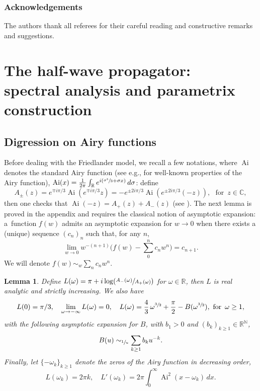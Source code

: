 \documentclass[11pt]{article}
\newcommand{\eg}{e.g.,\xspace}
\newcommand{\Psfrac}[2]{(\sfrac{#1}{#2})}
\DeclareMathOperator{\Ai}{Ai}
\newcommand\N{{\mathbb N}}
\newcommand\R{{\mathbb R}}
\theoremstyle{plain}
\newtheorem{lemma}{Lemma}
\theoremstyle{definition}
\begin{document}
\subsubsection*{Acknowledgements}
The authors thank all referees for their careful reading and constructive remarks and suggestions.

\section{The half-wave propagator:\texorpdfstring{\\}{cr} spectral analysis and parametrix construction}

\subsection{Digression on Airy functions}
Before dealing with the Friedlander model, we recall a few notations, where $\Ai$ denotes the standard Airy function (see \eg \cite{AFbook} for well-known properties of the Airy function), $ \Ai(x)=\frac 1 {2\pi } \int_{\R} e^{ i (\sfrac{\sigma^{3}}{3}+\sigma x)} \,d\sigma$: define
\begin{equation}
\label{eq:Apm}
A_\pm(z)=e^{\mp i\pi/3} \Ai(e^{\mp i\pi/3} z)=-e^{\pm 2i\pi/3} \Ai(e^{\pm 2i\pi/3} (-z)),\,\,\text{ for } \,
z\in \mathbb{C},
\end{equation}
then one checks that $\Ai(-z)=A_+(z)+A_-(z)$ (see \cite[(2.3)]{AFbook}). The next lemma is proved in the appendix and requires the classical notion of asymptotic expansion: a~function $f(w)$ admits an asymptotic expansion for $w\to 0$ when there exists a (unique) sequence $(c_{n})_{n}$ such that, for any $n$,
\[
\lim_{w\to 0} w^{-(n+1)}\biggl(f(w)-\sum_{0}^{n} c_{n} w^{n}\biggr)=c_{n+1}.
\]
We will denote $ f(w)\sim_{w} \sum_{n} c_{n} w^{n}$.
\begin{lemma}
\label{lemL}
Define
$L(\omega)=\pi+i\log \Psfrac{A_-(\omega)}{A_+(\omega)}$ for $\omega \in \R$,
then $L$ is real analytic and strictly increasing. We also
have
\begin{equation}
\label{eq:propL}
L(0)=\pi/3,\quad\lim_{\omega\to -\infty} L(\omega)=0,\quad
L(\omega)=\frac 4 3\, \omega^{\sfrac 3 2}+\frac{\pi}{2}-B(\omega^{\sfrac 3 2}),\,\,\text{for } \,\omega\geq 1,
\end{equation}
with the following asymptotic expansion for $B$, with $b_{1}>0$ and $(b_{k})_{k\geq 1}\in \R^{\N}$,
\begin{equation}
\label{eq:B}
B(u)\sim_{\sfrac 1u } \sum_{k\geq 1} b_k u^{-k}.
\end{equation}
Finally, let $\{-\omega_k\}_{k\geq 1}$ denote the zeros of the Airy function in decreasing order,
\begin{equation}
\label{eq:propL2}
L(\omega_k)=2\pi k,\quad L'(\omega_k)=2\pi \int_0^\infty \Ai^2(x-\omega_k) \,dx.
\end{equation}
\end{lemma}
\end{document}
